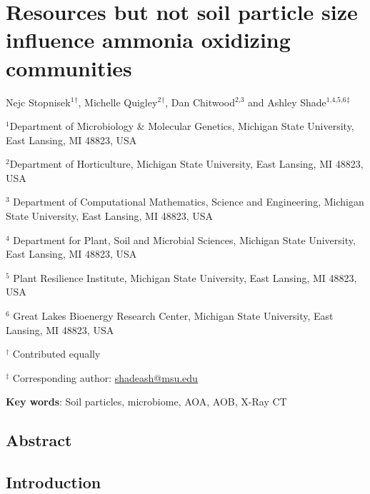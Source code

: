 \documentclass[
]{article}
\author{}
\date{\vspace{-2.5em}}
\begin{document}
\hypertarget{resources-but-not-soil-particle-size-influence-ammonia-oxidizing-communities}{%
\section{Resources but not soil particle size influence ammonia
oxidizing
communities}\label{resources-but-not-soil-particle-size-influence-ammonia-oxidizing-communities}}

\vspace{10mm}

Nejc Stopnisek\({^\text{1}}\)\({^\dagger}\), Michelle
Quigley\({^\text{2}}\)\({^\dagger}\), Dan Chitwood\({^\text{2,3}}\) and
Ashley Shade\({^\text{1,4,5,6}}\)\({^\ddagger}\)

\vspace{20mm}

\({^\text{1}}\)Department of Microbiology \& Molecular Genetics,
Michigan State University, East Lansing, MI 48823, USA

\({^\text{2}}\)Department of Horticulture, Michigan State University,
East Lansing, MI 48823, USA

\({^\text{3}}\) Department of Computational Mathematics, Science and
Engineering, Michigan State University, East Lansing, MI 48823, USA

\({^\text{4}}\) Department for Plant, Soil and Microbial Sciences,
Michigan State University, East Lansing, MI 48823, USA

\({^\text{5}}\) Plant Resilience Institute, Michigan State University,
East Lansing, MI 48823, USA

\({^\text{6}}\) Great Lakes Bioenergy Research Center, Michigan State
University, East Lansing, MI 48823, USA

\({^\dagger}\) Contributed equally

\({^\ddagger}\) Corresponding author:
\href{mailto:shadeash@msu.edu}{shadeash@msu.edu}

\vspace{40mm}

\textbf{Key words}: Soil particles, microbiome, AOA, AOB, X-Ray CT

\newpage

\hypertarget{abstract}{%
\subsection{Abstract}\label{abstract}}

\newpage

\hypertarget{introduction}{%
\subsection{Introduction}\label{introduction}}
\end{document}
